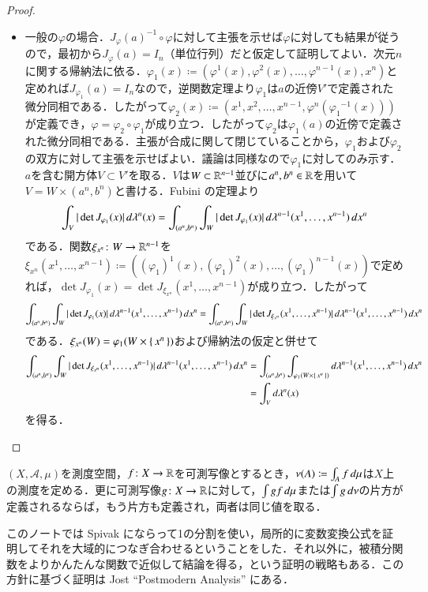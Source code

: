 \begin{proof}
\begin{itemize}
\item 一般の$\varphi$の場合．${J_{\varphi}(a)}^{-1} \circ \varphi$に対して主張を示せば$\varphi$に対しても結果が従うので，最初から$J_\varphi(a) = I_n$（単位行列）だと仮定して証明してよい．次元$n$に関する帰納法に依る．$\varphi_1(x) \coloneqq (\varphi^1(x), \varphi^2(x), \dots, \varphi^{n-1}(x), x^n)$と定めれば$J_{\varphi_1}(a) = I_n$なので，逆関数定理より$\varphi_1$は$a$の近傍$V'$で定義された微分同相である．したがって$\varphi_2(x) \coloneqq (x^1, x^2, \dots,x^{n-1}, \varphi^n({\varphi_1}^{-1}(x)))$が定義でき，$\varphi = \varphi_2 \circ \varphi_1$が成り立つ．したがって$\varphi_2$は$\varphi_1(a)$の近傍で定義された微分同相である．主張が合成に関して閉じていることから，$\varphi_1$および$\varphi_2$の双方に対して主張を示せばよい．議論は同様なので$\varphi_1$に対してのみ示す．$a$を含む開方体$V \subset V'$を取る．$V$は$W \subset \mathbb{R}^{n-1}$並びに$a^n, b^n \in \mathbb{R}$を用いて$V = W \times (a^n, b^n)$と書ける．Fubini の定理より
\begin{equation}
\int_V  |\det J_{\varphi_1}(x)| \mathop{}\!d \lambda^n(x) = \int_{(a^n,b^n)} \int_W  |\det J_{\varphi_1}(x)| \mathop{}\!d \lambda^{n-1}(x^1, \dots, x^{n-1}) \mathop{}\!d x^n
\end{equation}である．関数$\xi_{x^n} \colon W \to \mathbb{R}^{n-1}$を$\xi_{x^n}(x^1, \dots, x^{n-1}) \coloneqq ((\varphi_1)^1(x), (\varphi_1)^2(x), \dots, (\varphi_1)^{n-1}(x))$で定めれば，$\det J_{\varphi_1}(x) = \det J_{\xi_{x^n}}(x^1, \dots, x^{n-1})$が成り立つ．したがって
\begin{equation}
\int_{(a^n,b^n)} \int_W  |\det J_{\varphi_1}(x)| \mathop{}\!d \lambda^{n-1}(x^1, \dots, x^{n-1}) \mathop{}\!d x^n = \int_{(a^n,b^n)} \int_W  |\det J_{\xi_{x^n}}(x^1,\dots,x^{n-1})| \mathop{}\!d \lambda^{n-1}(x^1, \dots, x^{n-1}) \mathop{}\!d x^n
\end{equation}である．$\xi_{x^n}(W) = \varphi_1(W \times \set{x^n})$および帰納法の仮定と併せて
\begin{align}
\int_{(a^n,b^n)} \int_W  |\det J_{\xi_{x^n}}(x^1,\dots,x^{n-1})| \mathop{}\!d \lambda^{n-1}(x^1, \dots, x^{n-1}) \mathop{}\!d x^n &= \int_{(a^n,b^n)} \int_{\varphi_1(W\times \set{x^n})} \mathop{}\!d \lambda^{n-1}(x^1, \dots, x^{n-1}) \mathop{}\!d x^n \\
&= \int_V \mathop{}\!d \lambda^n(x)
\end{align}を得る．
\end{itemize}
\end{proof}

\begin{que}
$(X,\mathcal{A},\mu)$を測度空間，$f \colon X \to \mathbb{R}$を可測写像とするとき，$\nu(A) \coloneqq \int_A f \mathop{}\!d\mu$は$X$上の測度を定める．更に可測写像$g \colon X \to \mathbb{R}$に対して，$\int gf \mathop{}\!d \mu$または$\int g \mathop{}\!d \nu$の片方が定義されるならば，もう片方も定義され，両者は同じ値を取る．
\end{que}

\begin{que}[**]
このノートでは Spivak にならって1の分割を使い，局所的に変数変換公式を証明してそれを大域的につなぎ合わせるということをした．それ以外に，被積分関数をよりかんたんな関数で近似して結論を得る，という証明の戦略もある．この方針に基づく証明は Jost ``Postmodern Analysis'' にある．
\end{que}
